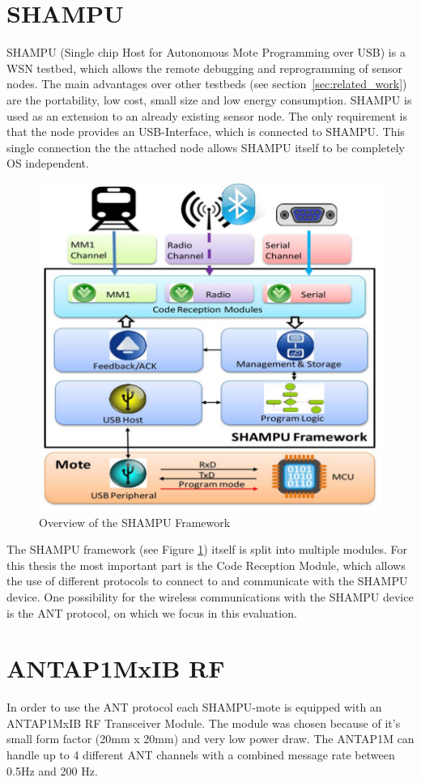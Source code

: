 \section{SHAMPU}
SHAMPU (Single chip Host for Autonomous Mote Programming over USB) \cite{Smeets:2014:DAL:2602339.2602401} is a WSN testbed, which allows the remote debugging and reprogramming of sensor nodes. The main advantages over other testbeds (see section~\ref{sec:related_work}) are the portability, low cost, small size and low energy consumption. SHAMPU is used as an extension to an already existing sensor node. The only requirement is that the node provides an USB-Interface, which is connected to SHAMPU. This single connection the the attached node allows SHAMPU itself to be completely OS independent.
\begin{figure}[H]
\centering
\includegraphics[scale=.5]{./pics/SHAMPUframework.png}
\caption{Overview of the SHAMPU Framework}\label{fig:shampuframework}
\end{figure}
The SHAMPU framework (see Figure \ref{fig:shampuframework}) itself is split into multiple modules. For this thesis the most important part is the Code Reception Module, which allows the use of different protocols to connect to and communicate with the SHAMPU device. One possibility for the wireless communications with the SHAMPU device is the ANT protocol, on which we focus in this evaluation.

\section{ANTAP1MxIB RF}
In order to use the ANT protocol each SHAMPU-mote is equipped with an ANTAP1MxIB RF Transceiver Module. The module was chosen because of it's small form factor (20mm x 20mm) and very low power draw. The ANTAP1M can handle up to 4 different ANT channels with a combined message rate between 0.5Hz and 200 Hz. 

